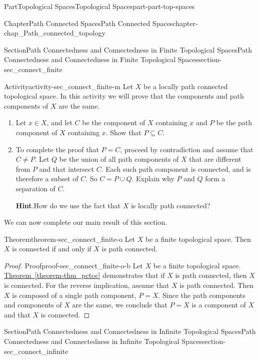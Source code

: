\documentclass[oneside,10pt,]{book}
\newcommand{\blocktitlefont}{\relax}
\newcommand{\xreffont}{\relax}
\numberwithin{equation}{chapter}
\begin{document}
\begin{partptx}{Part}{Topological Spaces}{}{Topological Spaces}{}{}{part-part-top-spaces}
\begin{chapterptx}{Chapter}{Path Connected Spaces}{}{Path Connected Spaces}{}{}{chapter-chap_Path_connected_topology}
\begin{sectionptx}{Section}{Path Connectedness and Connectedness in Finite Topological Spaces}{}{Path Connectedness and Connectedness in Finite Topological Spaces}{}{}{section-sec_connect_finite}
\begin{activity}{Activity}{}{activity-sec_connect_finite-m}%
Let \(X\) be a locally path connected topological space. In this activity we will prove that the components and path components of \(X\) are the same.%
\begin{enumerate}[font=\bfseries,label=(\alph*),ref=\alph*]%
\item{}Let \(x \in X\), and let \(C\) be the component of \(X\) containing \(x\) and \(P\) be the path component of \(X\) containing \(x\). Show that \(P \subseteq C\).%
\item{}To complete the proof that \(P = C\), proceed by contradiction and assume that \(C \neq P\). Let \(Q\) be the union of all path components of \(X\) that are different from \(P\) and that intersect \(C\). Each such path component is connected, and is therefore a subset of \(C\). So \(C = P \cup Q\). Explain why \(P\) and \(Q\) form a separation of \(C\).%
\par\smallskip%
\noindent\textbf{\blocktitlefont Hint}.\hypertarget{hint-sec_connect_finite-m-c-b}{}\quad{}How do we use the fact that \(X\) is locally path connected?%
\end{enumerate}%
\end{activity}%
We can now complete our main result of this section.%
\begin{theorem}{Theorem}{}{}{theorem-sec_connect_finite-o}%
Let \(X\) be a finite topological space. Then \(X\) is connected if and only if \(X\) is path connected.%
\end{theorem}
\begin{proof}{Proof}{}{proof-sec_connect_finite-o-b}
Let \(X\) be a finite topological space. \hyperref[theorem-thm_pctoc]{Theorem~{\xreffont\ref{theorem-thm_pctoc}}} demonstrates that if \(X\) is path connected, then \(X\) is connected. For the reverse implication, assume that \(X\) is path connected. Then \(X\) is composed of a single path component, \(P=X\). Since the path components and components of \(X\) are the same, we conclude that \(P= X\) is a component of \(X\) and that \(X\) is connected.%
\end{proof}
\end{sectionptx}
%
%
\typeout{************************************************}
\typeout{************************************************}
%
\begin{sectionptx}{Section}{Path Connectedness and Connectedness in Infinite Topological Spaces}{}{Path Connectedness and Connectedness in Infinite Topological Spaces}{}{}{section-sec_connect_infinite}

\end{sectionptx}
\end{chapterptx}
\end{partptx}
\end{document}
